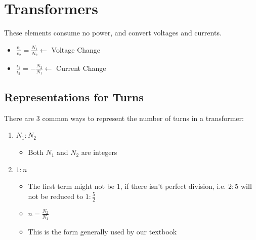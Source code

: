 \documentclass[10pt,letterpaper,final,twoside,notitlepage]{article}
\begin{document}
\section*{Transformers} \label{sec:Transformers}
These elements consume no power, and convert voltages and currents.
\begin{itemize}[noitemsep, nolistsep]
	\item $\frac{v_{1}}{v_{2}} = \frac{N_{1}}{N_{2}} \longleftarrow$ Voltage Change
	\item $\frac{i_{1}}{i_{2}} = -\frac{N_{2}}{N_{1}} \longleftarrow$ Current Change
\end{itemize}
\vspace{-4.75mm}

	\subsection*{Representations for Turns} \label{subsec:Turn Representations}
		There are 3 common ways to represent the number of turns in a transformer:
		\begin{enumerate}
			\item $N_{1} : N_{2}$
			\begin{itemize}[noitemsep, nolistsep]
				\item Both $N_{1}$ and $N_{2}$ are integers
			\end{itemize}
			\item $1 : n$
			\begin{itemize}[noitemsep, nolistsep]
				\item The first term might not be $1$, if there isn't perfect division, i.e. $2 : 5$ will not be reduced to $1 : \frac{5}{2}$
				\item $n = \frac{N_{2}}{N_{1}}$
				\item This is the form generally used by our textbook
			\end{itemize}
		\end{enumerate}
		\vspace{-5mm}
		
\end{document}
